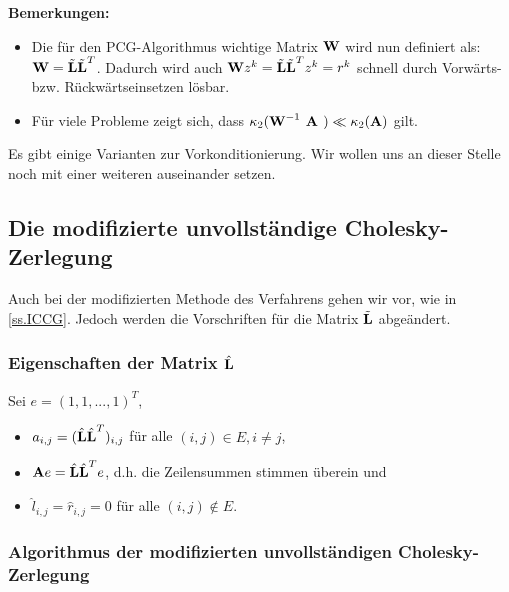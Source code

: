 \textbf{Bemerkungen:}

\begin{itemize}
\item Die für den PCG-Algorithmus wichtige Matrix ${\textbf{W}}$ wird nun definiert als: ${\textbf{W}} = \tilde{{\textbf{L}}} \tilde{{\textbf{L}}}^{T}$. Dadurch wird auch ${\textbf{W}}z^{k} = \tilde{{\textbf{L}}} \tilde{{\textbf{L}}}^{T}z^{k} = r^{k}$ schnell durch Vorwärts- bzw. Rückwärtseinsetzen lösbar.
\item Für viele Probleme zeigt sich, dass $\kappa_{2}({\textbf{W}}^{-1} {\textbf{ {\textbf{A}} }}) \ll \kappa_{2} ({\textbf{A}})$ gilt. \\
\end{itemize}

Es gibt einige Varianten zur Vorkonditionierung. Wir wollen uns an dieser Stelle noch mit einer weiteren auseinander setzen.

\subsection{Die modifizierte unvollständige Cholesky-Zerlegung}\label{ss.Modifizierte Cholesky}

Auch bei der modifizierten Methode des Verfahrens gehen wir vor, wie in \autoref{ss.ICCG}. Jedoch werden die Vorschriften für die Matrix $\tilde{{\textbf{L}}}$ abgeändert.

\subsubsection{Eigenschaften der Matrix $\hat{{\textbf{L}}}$}\label{sss.Eigenschaften L MCZ}

Sei $e = (1,1,...,1)^{T}$,

\begin{itemize}
\item $a_{i,j} = (\hat{{\textbf{L}}} \hat{{\textbf{L}}}^{T})_{i,j}$ für alle $(i,j) \in E, i \ne j$,
\item ${\textbf{A}} e = \hat{{\textbf{L}}} \hat{{\textbf{L}}}^{T} e$, d.h. die Zeilensummen stimmen überein und
\item $\hat l_{i,j} = \hat r_{i,j} = 0$ für alle $(i,j) \notin E$.
\end{itemize}

\subsubsection{Algorithmus der modifizierten unvollständigen Cholesky-Zerlegung}\label{sss.Algorithmus MUCZ}

